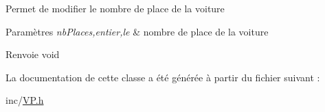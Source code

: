 Permet de modifier le nombre de place de la voiture


\begin{DoxyParams}{Paramètres}
{\em nbPlaces,entier,le} & nombre de place de la voiture \\
\hline
\end{DoxyParams}
\begin{DoxyReturn}{Renvoie}
void 
\end{DoxyReturn}


La documentation de cette classe a été générée à partir du fichier suivant :\begin{DoxyCompactItemize}
\item 
inc/\hyperlink{_v_p_8h}{VP.h}\end{DoxyCompactItemize}
